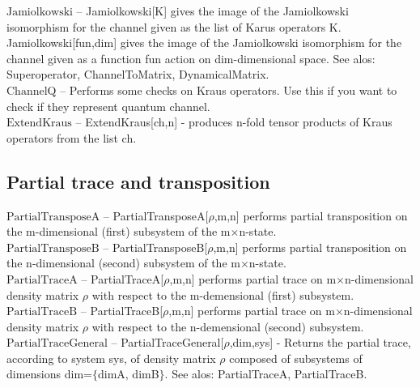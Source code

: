 \noindent\textbf{$ \text{Jamiolkowski} $ }-- Jamiolkowski[K] gives the image of the Jamiolkowski isomorphism for the channel given as the list of Karus operators K. Jamiolkowski[fun,dim] gives the image of the Jamiolkowski isomorphism for the channel given as a function fun action on dim-dimensional space. See alos: Superoperator, ChannelToMatrix, DynamicalMatrix.$  $\\

\noindent\textbf{$ \text{ChannelQ} $ }-- Performs some checks on Kraus operators. Use this if you want to check if they represent quantum channel.$  $\\

\noindent\textbf{$ \text{ExtendKraus} $ }-- ExtendKraus[ch,n] - produces n-fold tensor products of Kraus operators from the list ch.$  $\\

\subsection{Partial trace and transposition}

\noindent\textbf{$ \text{PartialTransposeA} $ }-- PartialTransposeA[$\rho $,m,n] performs partial transposition on the m-dimensional (first) subsystem of the m$\times $n-state.$  $\\

\noindent\textbf{$ \text{PartialTransposeB} $ }-- PartialTransposeB[$\rho $,m,n] performs partial transposition on the n-dimensional (second) subsystem of the m$\times $n-state.$  $\\

\noindent\textbf{$ \text{PartialTraceA} $ }-- PartialTraceA[$\rho $,m,n] performs partial trace on m$\times $n-dimensional density matrix $\rho $ with respect to the m-demensional (first) subsystem.$  $\\

\noindent\textbf{$ \text{PartialTraceB} $ }-- PartialTraceB[$\rho $,m,n] performs partial trace on m$\times $n-dimensional density matrix $\rho $ with respect to the n-demensional (second) subsystem.$  $\\

\noindent\textbf{$ \text{PartialTraceGeneral} $ }-- PartialTraceGeneral[$\rho $,dim,sys] - Returns the partial trace, according to system sys, of density matrix $\rho $ composed of subsystems of dimensions dim=$\{$dimA, dimB$\}$. See alos: PartialTraceA, PartialTraceB.$  $\\

